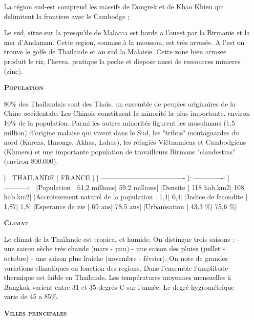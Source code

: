 \begin{multicols}{2}
La région sud-est comprend les massifs de Dongrek et de Khao Khieu qui delimitent la frontiere avec le Cambodge ;

Le sud, situe sur la presqu’ile de Malacca est borde a l’ouest par la Birmanie et la mer d’Andaman. Cette region, soumise à la mousson, est très arrosée. A l’est on trouve le golfe de Thailande et au sud la Malaisie. Cette zone bien arrosee produit le riz, l’hevea, pratique la peche et dispose aussi de ressources minieres (zinc).

\textbf{\textsc{Population}}

80\% des Thaïlandais sont des Thaïs, un ensemble de peuples originaires de la Chine occidentale. Les Chinois constituent la minorité la plus importante, environ 10\% de la population. Parmi les autres minorités figurent les musulmans (1,5 million) d’origine malaise qui vivent dans le Sud, les "tribus" montagnardes du nord (Karens, Hmongs, Akhas, Lahus), les réfugiés Viêtnamiens et Cambodgiens (Khmers) et une importante population de travailleurs Birmans "clandestins" (environ 800.000).

|                                       |     THAILANDE   |    FRANCE    |
| ------------------------------------- |: -------------: | -----------: |
|Population                             |    61,2 millions| 59,2 millions|
|Densite                                |      118 hab.km2|   108 hab.km2|
|Accroissement naturel de la population |              1,1|           0,4|
|Indice de fecondite                    |             1,87|           1,8|
|Esperance de vie                       |           69 ans|      78,5 ans|
|Urbanisation                           |           43,3 \%|        75,6 \%|

\textbf{\textsc{Climat}}

Le climat de la Thaïlande est tropical et humide. On distingue trois saisons :
- une saison sèche très chaude (mars - juin)
- une saison des pluies (juillet - octobre)
- une saison plus fraîche (novembre - février).
On note de grandes variations climatiques en fonction des regions. Dans l’ensemble l’amplitude thermique est faible en Thaïlande. Les températures moyennes mensuelles à Bangkok varient entre 31 et 35 degrés C sur l’année. Le degré hygrométrique varie de 45 a 85\%.

\textbf{\textsc{Villes principales}}


\end{multicols}
